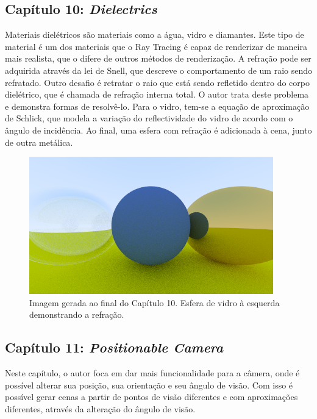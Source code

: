 \documentclass[journal]{IEEEtran}
\begin{document}
\subsection*{Capítulo 10: \emph{Dielectrics}}
Materiais dielétricos são materiais como a água, vidro e diamantes. Este tipo de material é um dos materiais
que o Ray Tracing é capaz de renderizar de maneira mais realista, que o difere de outros métodos de renderização.
A refração pode ser adquirida através da lei de Snell, que descreve o comportamento de um raio sendo refratado.
Outro desafio é retratar o raio que está sendo refletido dentro do corpo dielétrico, que é chamada de refração
interna total. O autor trata deste problema e demonstra formas de resolvê-lo. Para o vidro, tem-se a equação
de aproximação de Schlick, que modela a variação do reflectividade do vidro de acordo com o ângulo de incidência.
Ao final, uma esfera com refração é adicionada à cena, junto de outra metálica.

\begin{figure}[ht]
  \centering
  \includegraphics[width=\linewidth]{media/img-1.16-glass-hollow.png}
  \caption{Imagem gerada ao final do Capítulo 10. Esfera de vidro à esquerda demonstrando a refração.}
  \label{img_dieletric}
\end{figure}

\subsection*{Capítulo 11: \emph{Positionable Camera}}
Neste capítulo, o autor foca em dar mais funcionalidade para a câmera, onde é possível alterar sua posição,
sua orientação e seu ângulo de visão. Com isso é possível gerar cenas a partir de pontos de visão diferentes
e com aproximações diferentes, através da alteração do ângulo de visão.
\end{document}
